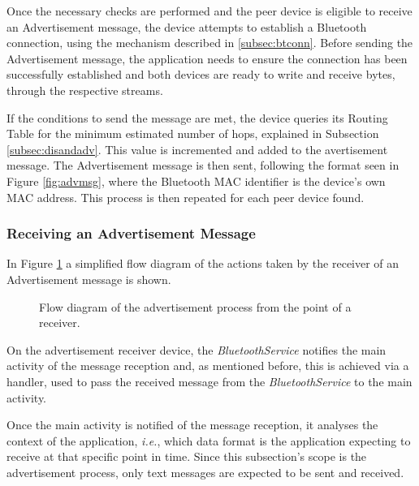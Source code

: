 Once the necessary checks are performed and the peer device is eligible to receive an Advertisement message, the device attempts to establish a Bluetooth connection, using the mechanism described in \ref{subsec:btconn}. Before sending the Advertisement message, the application needs to ensure the connection has been successfully established and both devices are ready to write and receive bytes, through the respective streams.

If the conditions to send the message are met, the device queries its Routing Table for the minimum estimated number of hops, explained in Subsection \ref{subsec:disandadv}. This value is incremented and added to the avertisement message. The Advertisement message is then sent, following the format seen in Figure \ref{fig:advmsg}, where the Bluetooth \gls{MAC} identifier is the device's own \gls{MAC} address. This process is then repeated for each peer device found.

\subsubsection{Receiving an Advertisement Message}
\label{subsubsec:rcvadv}

In Figure \ref{fig:recvadvflux} a simplified flow diagram of the actions taken by the receiver of an Advertisement message is shown.

\begin{figure}[ht]
	\noindent{}
	\caption{\label{fig:recvadvflux} Flow diagram of the advertisement process from the point of a receiver.}
\end{figure}

On the advertisement receiver device, the \textit{BluetoothService} notifies the main activity of the message reception and, as mentioned before, this is achieved via a handler, used to pass the received message from the \textit{BluetoothService} to the main activity.

Once the main activity is notified of the message reception, it analyses the context of the application, \textit{i.e.}, which data format is the application expecting to receive at that specific point in time. Since this subsection's scope is the advertisement process, only text messages are expected to be sent and received.

